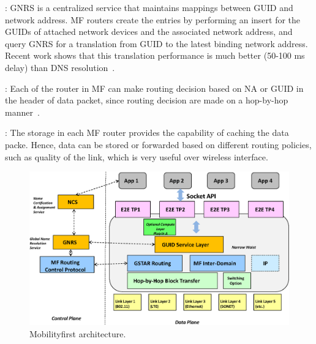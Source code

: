 \vspace{1mm}: GNRS is a centralized service that maintains mappings between GUID and network address. MF routers create the entries by performing an insert for the GUIDs of attached network devices and the associated network address, and query GNRS for a translation from GUID to the latest binding network address. Recent work shows that this translation performance is much better (50-100 ms delay) than DNS resolution~\cite{vu2012dmap}.

\vspace{1mm}: Each of the router in MF can make routing decision based on NA or GUID in the header of data packet, since routing decision are made on a hop-by-hop manner~\cite{nelson2011gstar}.

\vspace{1mm}: The storage in each MF router provides the capability of caching the data packe. Hence, data can be stored or forwarded based on different routing policies, such as quality of the link, which is very useful over wireless interface.
\begin{figure}
\centering
\includegraphics[width=\columnwidth]{figure/mf_arch.eps}
\caption{\label{fig:mf_arch}Mobilityfirst architecture.}
\end{figure}

